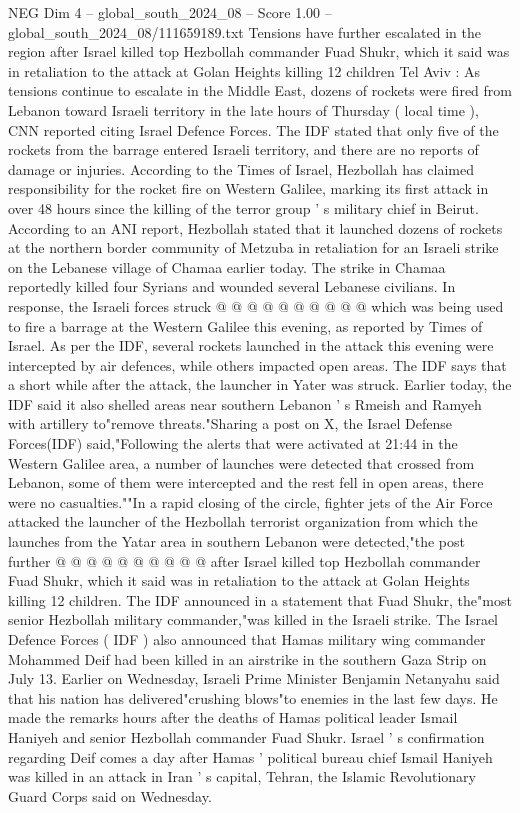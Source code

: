 \begin{textsample}{NEG Dim 4 – global\_south\_2024\_08 – Score 1.00 – global\_south\_2024\_08/111659189.txt}  \label{ex:f4_neg_333}
Tensions have further escalated in the region after Israel killed top Hezbollah commander Fuad Shukr, which it said was in retaliation to the attack at Golan Heights killing 12 children Tel Aviv : As tensions continue to escalate in the Middle East, dozens of rockets were fired from Lebanon toward Israeli territory in the late hours of Thursday ( local time ), CNN reported citing Israel Defence Forces.
The IDF stated that only five of the rockets from the barrage entered Israeli territory, and there are no reports of damage or injuries.
According to the Times of Israel, Hezbollah has claimed responsibility for the rocket fire on Western Galilee, marking its first attack in over 48 hours since the killing of the terror group ' s military chief in Beirut.
According to an ANI report, Hezbollah stated that it launched dozens of rockets at the northern border community of Metzuba in retaliation for an Israeli strike on the Lebanese village of Chamaa earlier today.
The strike in Chamaa reportedly killed four Syrians and wounded several Lebanese civilians.
In response, the Israeli forces struck @ @ @ @ @ @ @ @ @ @ which was being used to fire a barrage at the Western Galilee this evening, as reported by Times of Israel.
As per the IDF, several rockets launched in the attack this evening were intercepted by air defences, while others impacted open areas.
The IDF says that a short while after the attack, the launcher in Yater was struck.
Earlier today, the IDF said it also shelled areas near southern Lebanon ' s Rmeish and Ramyeh with artillery to"remove threats."Sharing a post on X, the Israel Defense Forces(IDF) said,"Following the alerts that were activated at 21:44 in the Western Galilee area, a number of launches were detected that crossed from Lebanon, some of them were intercepted and the rest fell in open areas, there were no casualties.""In a rapid closing of the circle, fighter jets of the Air Force attacked the launcher of the Hezbollah terrorist organization from which the launches from the Yatar area in southern Lebanon were detected,"the post further @ @ @ @ @ @ @ @ @ @ after Israel killed top Hezbollah commander Fuad Shukr, which it said was in retaliation to the attack at Golan Heights killing 12 children.
The IDF announced in a statement that Fuad Shukr, the"most senior Hezbollah military commander,"was killed in the Israeli strike.
The Israel Defence Forces ( IDF ) also announced that Hamas military wing commander Mohammed Deif had been killed in an airstrike in the southern Gaza Strip on July 13.
Earlier on Wednesday, Israeli Prime Minister Benjamin Netanyahu said that his nation has delivered"crushing blows"to enemies in the last few days.
He made the remarks hours after the deaths of Hamas political leader Ismail Haniyeh and senior Hezbollah commander Fuad Shukr.
Israel ' s confirmation regarding Deif comes a day after Hamas ' political bureau chief Ismail Haniyeh was killed in an attack in Iran ' s capital, Tehran, the Islamic Revolutionary Guard Corps said on Wednesday.

\end{textsample}
